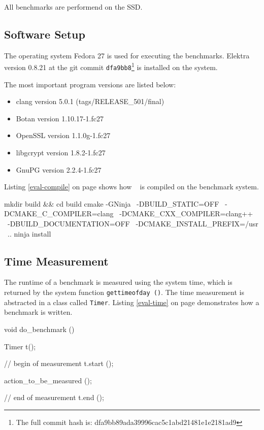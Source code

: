 All benchmarks are performend on the SSD.

  \subsection{Software Setup}

The operating system Fedora 27 is used for executing the benchmarks.
Elektra version 0.8.21 at the git commit \texttt{dfa9bb8}\footnote{The full commit hash is: dfa9bb89ada39996cac5c1abd21481e1e2181ad9} is installed on the system.

The most important program versions are listed below:

\begin{itemize}
  \item clang version 5.0.1 (tags/RELEASE\_501/final)
  \item Botan version 1.10.17-1.fc27
  \item OpenSSL version 1.1.0g-1.fc27
  \item libgcrypt version 1.8.2-1.fc27
  \item GnuPG version 2.2.4-1.fc27
\end{itemize}

Listing \ref{eval-compile} on page \pageref{eval-compile} shows how \elektra ~ is compiled on the benchmark system.

\begin{code}[label=eval-compile,language=bash,caption={Elektra compile options for the benchmarks}]
mkdir build && cd build
cmake -GNinja \
    -DBUILD_STATIC=OFF \
    -DCMAKE_C_COMPILER=clang \
    -DCMAKE_CXX_COMPILER=clang++ \
    -DBUILD_DOCUMENTATION=OFF \
    -DCMAKE_INSTALL_PREFIX=/usr \
    ..
ninja install
\end{code}

  \subsection{Time Measurement}

The runtime of a benchmark is measured using the system time, which is returned by the system function \texttt{gettimeofday ()}.
The time measurement is abstracted in a class called \texttt{Timer}.
Listing \ref{eval-time} on page \pageref{eval-time} demonstrates how a benchmark is written.

\begin{code}[label=eval-time,language=C,caption={Time measurement for the benchmarks}]
void do_benchmark ()
{
  Timer t();

  // begin of measurement
  t.start ();

  action_to_be_measured ();

  // end of measurement
  t.end ();
}
\end{code}

